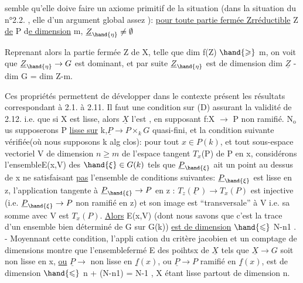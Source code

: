 semble qu'elle doive faire un axiome primitif de la situation (dans la
situation du n°2.2. , elle  d'un argument global assez  ):
\uline{pour toute partie fermée Zrréductible} Z \uline{de} P d\uline{e dimension} m, $\underline{Z}_{\hand{\eta}} \neq \emptyset$ 


 Reprenant alors la
partie fermée Z de X, telle que dim f(Z) $\hand{\geqslant}$ m, on voit que $\underline{Z}_{\hand{\eta}} \rightarrow G$ est
dominant, et par suite $\underline{Z}_{\hand{\eta}}$ est de dimension dim $\underline{Z}$ - dim G = dim Z-m.

Ces propriétés permettent de développer dans le contexte présent
les résultats correspondant à 2.1. à 2.11. Il faut une condition sur (D)
assurant la validité de 2.12. i.e. que si X est lisse, alors $\underline{X}$ l'est
, en supposant f:X $\longrightarrow$ P non ramifié. N$_{\mathrm{o}}$us supposerons
 P \uline{lisse sur} k,$\underline{P} \rightarrow P \times_k G$ quasi-fini, et la condition suivante vérifiée(où nous supposons k alg clos): pour
tout $x \in P(k)$, et tout sous-espace vectoriel V de dimension $n \geqslant m$ de l'espace tangent
$T_x$(P) de P en x, considérons l'ensembleE(x,V)  des $\hand{\xi} \in G(k)$ tels que
$\underline{P}_{\hand{\xi}}$ ait un point au dessus de x 
ne satisfaisant \uline{pas} l'ensemble de conditions suivantes: $\underline{P}_{\hand{\xi}}$ est lisse en
z, 
l'application tangente à $\underline{P}_{\hand{\xi}} \rightarrow P$ en z : $T_z(\underline{P}\ ) \rightarrow T_x(P)$ est injective
(i.e. $\underline{P}_{\hand{\xi}} \rightarrow P$ non ramifié en z) et son image est ``transversale'' à V
i.e. sa somme avec V est $T_x(P)$. \uline{Alors} E(x,V) (dont nous savons que
c'est la trace d'un ensemble   bien déterminé de G sur G(k))
\uline{est de dimension} $\hand{\leqslant}$ N-n\unsure{-}1 . - Moyennant cette condition,  l'appli\unsure{:}
cation du critère jacobien et un comptage de dimensions montre que
l'ensemblefermé E des poihtsx de $\underline{X}$ tels que $\underline{X} \longrightarrow G$ soit non lisse en x, \uline{ou}
$\underline{P} \longrightarrow$  non lisse en $\underline{f}(x)$, ou $\underline{P} \longrightarrow P$ ramifié en $\underline{f}(x)$, est de
dimension $\hand{\leqslant}$ n + (N-n\unsure{-}1) = N-1 , \hand{(}X étant lisse partout de dimension n\hand{)}.

